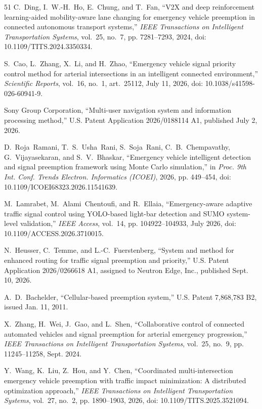 \documentclass[journal,10pt,twocolumn]{IEEEtran}
\begin{document}
\begin{thebibliography}{51}
C.~Ding, I.~W.-H.~Ho, E.~Chung, and T.~Fan, ``V2X and deep reinforcement learning-aided mobility-aware lane changing for emergency vehicle preemption in connected autonomous transport systems,'' \emph{IEEE Transactions on Intelligent Transportation Systems}, vol.~25, no.~7, pp. 7281--7293, 2024, doi: 10.1109/TITS.2024.3350334.

S.~Cao, L.~Zhang, X.~Li, and H.~Zhao, ``Emergency vehicle signal priority control method for arterial intersections in an intelligent connected environment,'' \emph{Scientific Reports}, vol.~16, no.~1, art.~25112, July 11, 2026, doi: 10.1038/s41598-026-60941-9.

Sony Group Corporation, ``Multi-user navigation system and information processing method,'' U.S. Patent Application 2026/0188114 A1, published July 2, 2026.

D.~Roja~Ramani, T.~S.~Usha~Rani, S.~Soja~Rani, C.~B.~Chempavathy, G.~Vijayasekaran, and S.~V.~Bhaskar, ``Emergency vehicle intelligent detection and signal preemption framework using Monte Carlo simulation,'' in \emph{Proc. 9th Int. Conf. Trends Electron. Informatics (ICOEI)}, 2026, pp. 449--454, doi: 10.1109/ICOEI68323.2026.11541639.

M.~Lamrabet, M.~Alami~Chentoufi, and R.~Ellaia, ``Emergency-aware adaptive traffic signal control using YOLO-based light-bar detection and SUMO system-level validation,'' \emph{IEEE Access}, vol.~14, pp. 104922--104933, July 2026, doi: 10.1109/ACCESS.2026.3710015.

N.~Heusser, C.~Temme, and L.-C.~Fuerstenberg, ``System and method for enhanced routing for traffic signal preemption and priority,'' U.S. Patent Application 2026/0266618 A1, assigned to Neutron Edge, Inc., published Sept. 10, 2026.

A.~D.~Bachelder, ``Cellular-based preemption system,'' U.S. Patent 7,868,783 B2, issued Jan. 11, 2011.

X.~Zhang, H.~Wei, J.~Gao, and L.~Shen, ``Collaborative control of connected automated vehicles and signal preemption for arterial emergency progression,'' \emph{IEEE Transactions on Intelligent Transportation Systems}, vol.~25, no.~9, pp. 11245--11258, Sept. 2024.

Y.~Wang, K.~Liu, Z.~Hou, and Y.~Chen, ``Coordinated multi-intersection emergency vehicle preemption with traffic impact minimization: A distributed optimization approach,'' \emph{IEEE Transactions on Intelligent Transportation Systems}, vol.~27, no.~2, pp. 1890--1903, 2026, doi: 10.1109/TITS.2025.3521094.


\end{thebibliography}
\end{document}

